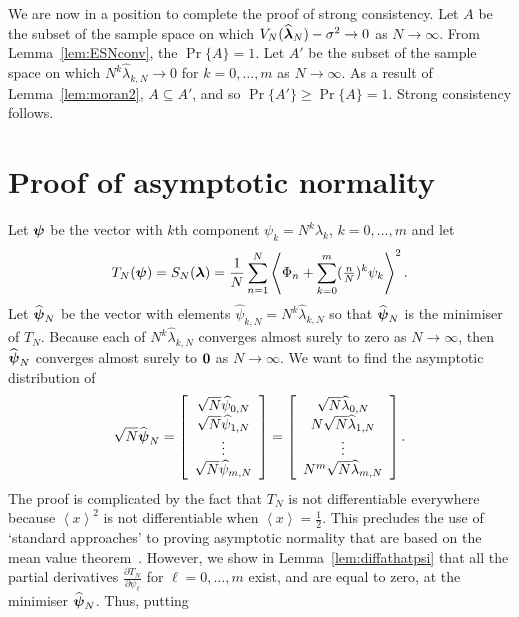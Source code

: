 \documentclass[aap]{imsart}
\newcommand{\prob}{\operatorname{Pr}}
\newcommand{\fracpart}[1]{\left\langle #1 \right\rangle}
\begin{document}
We are now in a position to complete the proof of strong consistency.  Let $A$ be the subset of the sample space on which  $V_N(\widehat{\boldsymbol{\lambda}}_N) - \sigma^2 \rightarrow 0$ as $N\rightarrow\infty$.  From Lemma~\ref{lem:ESNconv}, the $\prob\{A\} =1$.  Let $A'$ be the subset of the sample space on which $N^k\widehat{\lambda}_{k,N} \rightarrow 0$ for $k=0,\dots,m$ as $N\rightarrow\infty$.  As a result of Lemma~\ref{lem:moran2}, $A \subseteq A'$, and so $\prob\{A'\} \geq \prob\{A\} = 1$.  Strong consistency follows.

 
\section{Proof of asymptotic normality}\label{sec:centlimitproof}

Let $\boldsymbol{\psi}$ be the vector with $k$th component $\psi_k = N^k \lambda_k$, $k=0, \dots, m$ and let 
\[
T_{N}(\psibf) = S_N(\lambdabf) = \frac{1}{N} \sum_{n=1}^{N} \fracpart{ \Phi_n + \sum_{k=0}^m (\tfrac{n}{N})^k \psi_k }^2.
\]
Let $\widehat{\boldsymbol{\psi}}_N$ be the vector with elements $\widehat{\psi}_{k,N} = N^k \widehat{\lambda}_{k,N}$ so that $\widehat{\boldsymbol{\psi}}_N$ is the minimiser of $T_N$.  Because each of $N^k \widehat{\lambda}_{k,N}$ converges almost surely to zero as $N \rightarrow \infty$, then $\widehat{\boldsymbol{\psi}}_{N}$ converges almost surely to $\boldsymbol{0}$ as $N \rightarrow \infty$.  We want to find the asymptotic distribution of
\[
\sqrt{N}\widehat{\psibf}_{N} = 
\left[
\begin{array}
[c]{c}%
\sqrt{N} \widehat{\psi}_{0,N} \\ \sqrt{N}\widehat{\psi}_{1,N}  \\ \vdots \\ \sqrt{N} \widehat{\psi}_{m,N}
\end{array}
\right]
=
\left[
\begin{array}
[c]{c}%
\sqrt{N} \widehat{\lambda}_{0,N} \\ N\sqrt{N}\widehat{\lambda}_{1,N} \\ \vdots \\ N^m\sqrt{N} \widehat{\lambda}_{m,N}
\end{array}
\right].
\]
The proof is complicated by the fact that $T_N$ is not differentiable everywhere because $\fracpart{x}^2$ is not differentiable when $\fracpart{x} = \tfrac{1}{2}$.  This precludes the use of `standard approaches' to proving asymptotic normality that are based on the mean value theorem~\cite{vonMises_diff_stats_1947,Pollard_new_ways_clts_1986,Pollard_conv_stat_proc_1984,Pollard_asymp_empi_proc_1989}.  However, we show in Lemma~\ref{lem:diffathatpsi} that all the partial derivatives $\frac{\partial T_N}{\partial \psi_\ell}$ for $\ell = 0, \dots, m$ exist, and are equal to zero, at the minimiser $\widehat{\boldsymbol{\psi}}_N$.  Thus, putting
\end{document}
